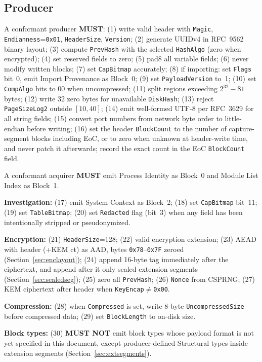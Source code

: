 \documentclass[11pt,a4paper]{article}
\newcommand{\MUST}{\textbf{MUST}}
\newcommand{\MUSTNOT}{\textbf{MUST NOT}}
\newcommand{\hex}[1]{\texttt{0x#1}}
\newcommand{\field}[1]{\texttt{#1}}
\begin{document}
\subsection{Producer}
A conformant producer \MUST: (1) write valid header with \field{Magic}, \field{Endianness}={}\allowbreak\hex{01}, \field{HeaderSize}, \field{Version}; (2) generate UUIDv4 in RFC~9562 binary layout; (3) compute \field{PrevHash} with the selected \field{HashAlgo} (zero when encrypted); (4) set reserved fields to zero; (5) pad8 all variable fields; (6) never modify written blocks; (7) set \field{CapBitmap} accurately; (8) if importing: set \field{Flags} bit~0, emit Import Provenance as Block~0; (9) set \field{PayloadVersion} to~1; (10) set \field{CompAlgo} bits to 00 when uncompressed; (11) split regions exceeding $2^{32}{-}81$ bytes; (12) write 32 zero bytes for unavailable \field{DiskHash}; (13) reject \field{PageSizeLog2} outside $[10,40]$; (14) emit well-formed UTF-8 per RFC~3629 for all string fields; (15) convert port numbers from network byte order to little-endian before writing; (16) set the header \field{BlockCount} to the number of capture-segment blocks including EoC, or to zero when unknown at header-write time, and never patch it afterwards; record the exact count in the EoC \field{BlockCount} field.

A conformant acquirer \MUST{} emit Process Identity as Block~0 and Module List Index as Block~1.

\noindent\textbf{Investigation:} (17) emit System Context as Block~2; (18) set \field{CapBitmap} bit~11; (19) set \field{TableBitmap}; (20) set \field{Redacted} flag (bit~3) when any field has been intentionally stripped or pseudonymized.

\noindent\textbf{Encryption:} (21) \field{HeaderSize}=128; (22) valid encryption extension; (23) AEAD with header (+KEM ct) as AAD, bytes \hex{78}--\hex{7F} zeroed (Section~\ref{sec:enclayout}); (24) append 16-byte tag immediately after the ciphertext, and append after it only sealed extension segments (Section~\ref{sec:sealedseg}); (25) zero all \field{PrevHash}; (26) \field{Nonce} from CSPRNG; (27) KEM ciphertext after header when \field{KeyEncap}$\neq$\hex{00}.

\noindent\textbf{Compression:} (28) when \field{Compressed} is set, write 8-byte \field{UncompressedSize} before compressed data; (29) set \field{BlockLength} to on-disk size.

\noindent\textbf{Block types:} (30) \MUSTNOT{} emit block types whose payload format is not yet specified in this document, except producer-defined Structural types inside extension segments (Section~\ref{sec:extsegments}).
\end{document}
